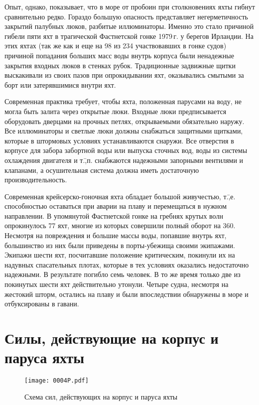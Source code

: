 Опыт, однако, показывает, что в море от пробоин при столкновениях яхты
гибнут сравнительно редко. Гораздо большую опасность представляет
негерметичность закрытий палубных люков, разбитые иллюминаторы. Именно
это стало причиной гибели пяти яхт в трагической Фастнетской гонке
1979\,г. у берегов Ирландии. На этих яхтах (так же как и еще на 98 из
234 участвовавших в гонке судов) причиной попадания больших масс воды
внутрь корпуса были ненадежные закрытия входных люков в стенках
рубок. Традиционные задвижные щитки выскакивали из своих пазов при
опрокидывании яхт, оказывались смытыми за борт или затерявшимися
внутри яхт.

Современная практика требует, чтобы яхта, положенная парусами на воду,
не могла быть залита через открытые люки. Входные люки предписывается
оборудовать дверцами на прочных петлях, открываемыми обязательно
наружу. Все иллюминаторы и светлые люки должны снабжаться защитными
щитками, которые в штормовых условиях устанавливаются снаружи. Все
отверстия в корпусе для забора забортной воды или выпуска сточных вод,
воды из системы охлаждения двигателя и т.\=,п. снабжаются надежными
запорными вентилями и клапанами, а осушительная система должна иметь
достаточную производительность.

Современная крейсерско-гоночная яхта обладает большой живучестью,
т.\=,е. способностью оставаться при аварии на плаву и перемещаться в
нужном направлении. В упомянутой Фастнетской гонке на гребнях крутых
волн опрокинулось 77 яхт, многие из которых совершили полный оборот на
360\gr. Несмотря на повреждения и большие массы воды, попавшие внутрь
яхт, большинство из них были приведены в порты-убежища своими
экипажами. Экипажи шести яхт, посчитавшие положение критическим,
покинули их на надувных спасательных плотах, которые в тех условиях
оказались недостаточно надежными. В результате погибло семь человек. В
то же время только две из покинутых шести яхт действительно
утонули. Четыре судна, несмотря на жестокий шторм, остались на плаву и
были впоследствии обнаружены в море и отбуксированы в гавани.

\section{Силы, действующие на корпус и паруса яхты}

\begin{figure}[htb]
  \centering\texttt{[image: 0004P.pdf]}
  \caption{\centering{} Схема сил, действующих на корпус и паруса яхты}
  \label{fig:4}
\end{figure}

